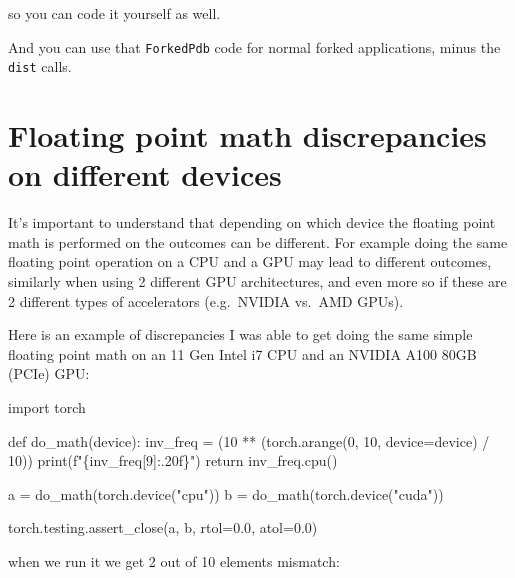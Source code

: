 \documentclass[
]{report}
\newenvironment{Shaded}{\begin{snugshade}}{\end{snugshade}}
\newcommand{\BuiltInTok}[1]{\textcolor[rgb]{0.00,0.23,0.31}{#1}}
\newcommand{\ControlFlowTok}[1]{\textcolor[rgb]{0.00,0.23,0.31}{#1}}
\newcommand{\DecValTok}[1]{\textcolor[rgb]{0.68,0.00,0.00}{#1}}
\newcommand{\FloatTok}[1]{\textcolor[rgb]{0.68,0.00,0.00}{#1}}
\newcommand{\ImportTok}[1]{\textcolor[rgb]{0.00,0.46,0.62}{#1}}
\newcommand{\KeywordTok}[1]{\textcolor[rgb]{0.00,0.23,0.31}{#1}}
\newcommand{\NormalTok}[1]{\textcolor[rgb]{0.00,0.23,0.31}{#1}}
\newcommand{\OperatorTok}[1]{\textcolor[rgb]{0.37,0.37,0.37}{#1}}
\newcommand{\SpecialCharTok}[1]{\textcolor[rgb]{0.37,0.37,0.37}{#1}}
\newcommand{\SpecialStringTok}[1]{\textcolor[rgb]{0.13,0.47,0.30}{#1}}
\newcommand{\StringTok}[1]{\textcolor[rgb]{0.13,0.47,0.30}{#1}}
\begin{document}
so you can code it yourself as well.

And you can use that \texttt{ForkedPdb} code for normal forked
applications, minus the \texttt{dist} calls.

\section{Floating point math discrepancies on different
devices}\label{floating-point-math-discrepancies-on-different-devices}

It's important to understand that depending on which device the floating
point math is performed on the outcomes can be different. For example
doing the same floating point operation on a CPU and a GPU may lead to
different outcomes, similarly when using 2 different GPU architectures,
and even more so if these are 2 different types of accelerators
(e.g.~NVIDIA vs.~AMD GPUs).

Here is an example of discrepancies I was able to get doing the same
simple floating point math on an 11 Gen Intel i7 CPU and an NVIDIA A100
80GB (PCIe) GPU:

\begin{Shaded}
\begin{Highlighting}[]
\ImportTok{import}\NormalTok{ torch}

\KeywordTok{def}\NormalTok{ do\_math(device):}
\NormalTok{    inv\_freq }\OperatorTok{=}\NormalTok{ (}\DecValTok{10} \OperatorTok{**}\NormalTok{ (torch.arange(}\DecValTok{0}\NormalTok{, }\DecValTok{10}\NormalTok{, device}\OperatorTok{=}\NormalTok{device) }\OperatorTok{/} \DecValTok{10}\NormalTok{))}
    \BuiltInTok{print}\NormalTok{(}\SpecialStringTok{f"}\SpecialCharTok{\{}\NormalTok{inv\_freq[}\DecValTok{9}\NormalTok{]}\SpecialCharTok{:.20f\}}\SpecialStringTok{"}\NormalTok{)}
    \ControlFlowTok{return}\NormalTok{ inv\_freq.cpu()}

\NormalTok{a }\OperatorTok{=}\NormalTok{ do\_math(torch.device(}\StringTok{"cpu"}\NormalTok{))}
\NormalTok{b }\OperatorTok{=}\NormalTok{ do\_math(torch.device(}\StringTok{"cuda"}\NormalTok{))}

\NormalTok{torch.testing.assert\_close(a, b, rtol}\OperatorTok{=}\FloatTok{0.0}\NormalTok{, atol}\OperatorTok{=}\FloatTok{0.0}\NormalTok{)}
\end{Highlighting}
\end{Shaded}

when we run it we get 2 out of 10 elements mismatch:
\end{document}
